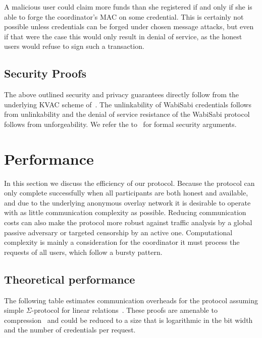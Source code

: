 \documentclass[a4paper]{article}
\begin{document}
A malicious user could claim more funds than she registered if and only if she is able to forge the coordinator's MAC on some credential. This is certainly not possible unless credentials can be forged under chosen message attacks, but even if that were the case this would only result in denial of service, as the honest users would refuse to sign such a transaction.

\subsection{Security Proofs}
The above outlined security and privacy guarantees directly follow from the underlying KVAC scheme of~\cite{chase2019signal}. The unlinkability of WabiSabi credentials follows from unlinkability and the denial of service resistance of the WabiSabi protocol follows from unforgeability. We refer the to~\cite{chase2019signal} for formal security arguments.

\section{Performance}\label{sec:performanceanalysis}

In this section we discuss the efficiency of our protocol. Because the protocol can only complete successfully when all participants are both honest and available, and due to the underlying anonymous overlay network it is desirable to operate with as little communication complexity as possible. Reducing communication costs can also make the protocol more robust against traffic analysis by a global passive adversary or targeted censorship by an active one. Computational complexity is mainly a consideration for the coordinator it must process the requests of all users, which follow a bursty pattern.

\subsection{Theoretical performance}

The following table estimates communication overheads for the protocol assuming simple $\Sigma$-protocol for linear relations~\cite[19.5.3 pp. 747-8, 20.4.1 pp. 792]{boneh2020graduate}. These proofs are amenable to compression~\cite{bunz2018bulletproofs, attema2020compressed} and could be reduced to a size that is logarithmic in the bit width and the number of credentials per request.
\end{document}
